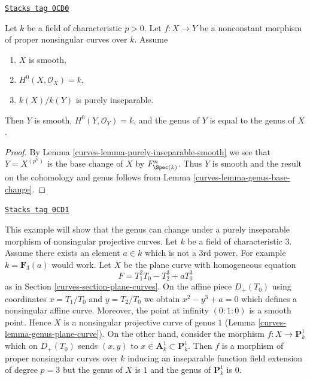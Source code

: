 \begin{lemma}
\label{curves-lemma-purely-inseparable-smooth-genus}
\href{https://stacks.math.columbia.edu/tag/0CD0}{\texttt{Stacks tag 0CD0}}

Let $k$ be a field of characteristic $p > 0$. Let $f : X \to Y$ be a
nonconstant morphism of proper nonsingular curves over $k$.
Assume
\begin{enumerate}
\item $X$ is smooth,
\item $H^0(X, \mathcal{O}_X) = k$,
\item $k(X)/k(Y)$ is purely inseparable.
\end{enumerate}
Then $Y$ is smooth, $H^0(Y, \mathcal{O}_Y) = k$, and the genus of $Y$
is equal to the genus of $X$.
\end{lemma}

\begin{proof}

By Lemma \ref{curves-lemma-purely-inseparable-smooth}
we see that $Y = X^{(p^n)}$ is the base change of
$X$ by $F_{\Spec(k)}^n$. Thus $Y$ is smooth and the result on the
cohomology and genus follows from
Lemma \ref{curves-lemma-genus-base-change}.
\end{proof}

\begin{example}[Inseparable]
\label{curves-example-inseparable}
\href{https://stacks.math.columbia.edu/tag/0CD1}{\texttt{Stacks tag 0CD1}}

This example will show that the genus can change under a
purely inseparable morphism of nonsingular projective curves.
Let $k$ be a field of characteristic $3$. Assume there exists
an element $a \in k$ which is not a $3$rd power. For example
$k = \mathbf{F}_3(a)$ would work. Let $X$ be the plane curve
with homogeneous equation
$$
F = T_1^2T_0 - T_2^3 + aT_0^3
$$
as in Section \ref{curves-section-plane-curves}.
On the affine piece $D_+(T_0)$ using coordinates $x = T_1/T_0$
and $y = T_2/T_0$ we obtain $x^2 - y^3 + a = 0$ which defines
a nonsingular affine curve. Moreover, the point at infinity
$(0 : 1: 0)$ is a smooth point. Hence $X$ is a nonsingular projective
curve of genus $1$ (Lemma \ref{curves-lemma-genus-plane-curve}).
On the other hand, consider the morphism
$f : X \to \mathbf{P}^1_k$ which on $D_+(T_0)$ sends $(x, y)$ to
$x \in \mathbf{A}^1_k \subset \mathbf{P}^1_k$.
Then $f$ is a morphism of proper nonsingular curves over $k$
inducing an inseparable function field extension of degree $p = 3$
but the genus of $X$ is $1$ and the genus of $\mathbf{P}^1_k$ is $0$.
\end{example}

